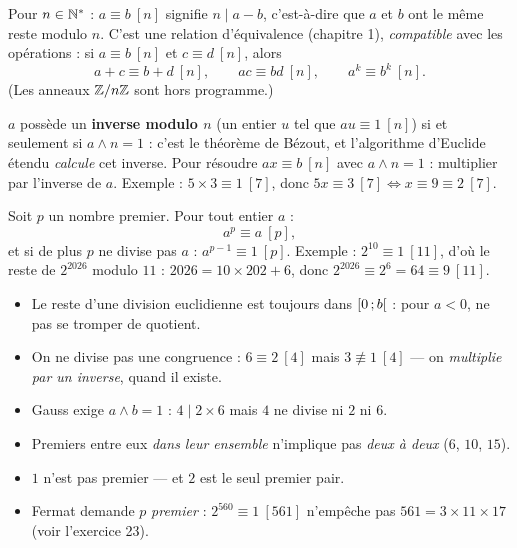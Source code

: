 
\begin{definition}
Pour $n\in\mathbb{N}^{*}$ : $a\equiv b\ [n]$ signifie $n\mid a-b$, c'est-à-dire que
$a$ et $b$ ont le même reste modulo $n$. C'est une relation d'équivalence
(chapitre 1), \emph{compatible} avec les opérations : si $a\equiv b\ [n]$
et $c\equiv d\ [n]$, alors
\[
  a+c\equiv b+d\ [n],\qquad ac\equiv bd\ [n],\qquad a^{k}\equiv b^{k}\ [n].
\]
(Les anneaux $\mathbb{Z}/n\mathbb{Z}$ sont hors programme.)
\end{definition}

\begin{savoirfaire}
$a$ possède un \textbf{inverse modulo $n$} (un entier $u$ tel que
$au\equiv1\ [n]$) si et seulement si $a\wedge n=1$ : c'est le théorème de
Bézout, et l'algorithme d'Euclide étendu \emph{calcule} cet inverse. Pour
résoudre $ax\equiv b\ [n]$ avec $a\wedge n=1$ : multiplier par l'inverse de
$a$. Exemple : $5\times3\equiv1\ [7]$, donc
$5x\equiv3\ [7]\iff x\equiv9\equiv2\ [7]$.
\end{savoirfaire}

\begin{theoreme}
Soit $p$ un nombre premier. Pour tout entier $a$ :
\[
  a^{p}\equiv a\ [p],
\]
et si de plus $p$ ne divise pas $a$ :
$a^{p-1}\equiv1\ [p]$.
Exemple : $2^{10}\equiv1\ [11]$, d'où le reste de $2^{2026}$ modulo $11$ :
$2026=10\times202+6$, donc $2^{2026}\equiv2^{6}=64\equiv9\ [11]$.
\end{theoreme}

\begin{attention}
\begin{itemize}[label={\color{otOrange}\textbullet},leftmargin=1.4em,itemsep=0.6mm,topsep=0.5mm]
  \item Le reste d'une division euclidienne est toujours dans
    $\mathopen{[}0\,{;}\,b\mathclose{[}$ : pour $a<0$, ne pas se tromper de quotient.
  \item On ne divise pas une congruence : $6\equiv2\ [4]$ mais
    $3\not\equiv1\ [4]$ — on \emph{multiplie par un inverse}, quand il existe.
  \item Gauss exige $a\wedge b=1$ : $4\mid2\times6$ mais $4$ ne divise ni
    $2$ ni $6$.
  \item Premiers entre eux \emph{dans leur ensemble} n'implique pas
    \emph{deux à deux} ($6$, $10$, $15$).
  \item $1$ n'est pas premier — et $2$ est le seul premier pair.
  \item Fermat demande $p$ \emph{premier} : $2^{560}\equiv1\ [561]$
    n'empêche pas $561=3\times11\times17$ (voir l'exercice 23).
\end{itemize}
\end{attention}

